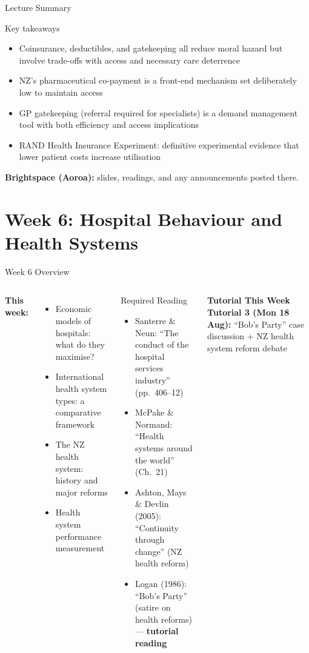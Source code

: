 \documentclass[aspectratio=169, 12pt]{beamer}
\newcommand{\summaryside}[1]{%
  \begin{frame}{Lecture Summary}
    \begin{exampleblock}{Key takeaways}
      \begin{itemize}#1\end{itemize}
    \end{exampleblock}
    \vspace{0.5em}
    {\footnotesize\textcolor{OtagoGold}{\textbf{Brightspace (Aoroa):}} slides, readings, and any announcements posted there.}
  \end{frame}}
\newcommand{\tutorialbox}[1]{%
  \begin{block}{\textbf{Tutorial This Week}}
    #1
  \end{block}}
\begin{document}
\summaryside{
  \item Coinsurance, deductibles, and gatekeeping all reduce moral hazard but involve trade-offs with access and necessary care deterrence
  \item NZ's pharmaceutical co-payment is a front-end mechanism set deliberately low to maintain access
  \item GP gatekeeping (referral required for specialists) is a demand management tool with both efficiency and access implications
  \item RAND Health Insurance Experiment: definitive experimental evidence that lower patient costs increase utilisation
}



\section{Week 6: Hospital Behaviour and Health Systems}

\begin{frame}{Week 6 Overview}
  \begin{columns}
      \textbf{This week:}
      \begin{itemize}
        \item Economic models of hospitals: what do they maximise?
        \item International health system types: a comparative framework
        \item The NZ health system: history and major reforms
        \item Health system performance measurement
      \end{itemize}
      \begin{block}{Required Reading}
        {\small
        \begin{itemize}
          \item Santerre \& Neun: ``The conduct of the hospital services industry'' (pp.\ 406--12)
          \item McPake \& Normand: ``Health systems around the world'' (Ch.\ 21)
          \item Ashton, Mays \& Devlin (2005): ``Continuity through change'' (NZ health reform)
          \item Logan (1986): ``Bob's Party'' (satire on health reforms) --- \textbf{tutorial reading}
        \end{itemize}}
      \end{block}
      \vspace{0.2em}
      \tutorialbox{\textbf{Tutorial 3 (Mon 18 Aug):} ``Bob's Party'' case discussion + NZ health system reform debate}
  \end{columns}
\end{frame}
\end{document}
